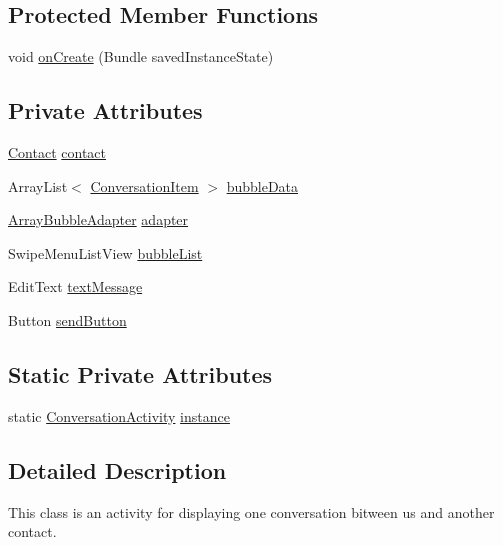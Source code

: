 \subsection*{Protected Member Functions}
\begin{DoxyCompactItemize}
\item 
void \hyperlink{a00006_a85e87cb5ced88dff7c8173ecc4f636d1}{on\+Create} (Bundle saved\+Instance\+State)
\end{DoxyCompactItemize}
\subsection*{Private Attributes}
\begin{DoxyCompactItemize}
\item 
\hyperlink{a00005}{Contact} \hyperlink{a00006_a3459849ab29ad684658dbcd0cf8c5d5a}{contact}
\item 
Array\+List$<$ \hyperlink{a00007}{Conversation\+Item} $>$ \hyperlink{a00006_a68544a0bda28776dfb51718a3c71bf69}{bubble\+Data}
\item 
\hyperlink{a00002}{Array\+Bubble\+Adapter} \hyperlink{a00006_adaad4a865e59995c45ef2ad13f6e88a9}{adapter}
\item 
Swipe\+Menu\+List\+View \hyperlink{a00006_ae5bb074a89738fa417e643960b0041c6}{bubble\+List}
\item 
Edit\+Text \hyperlink{a00006_abc418be8d11246756bfcb7f95123a88d}{text\+Message}
\item 
Button \hyperlink{a00006_a2e4d147a434708e05027f41ecf9ed577}{send\+Button}
\end{DoxyCompactItemize}
\subsection*{Static Private Attributes}
\begin{DoxyCompactItemize}
\item 
static \hyperlink{a00006}{Conversation\+Activity} \hyperlink{a00006_a64a39fb2b7f756356462736dfbdb9f9f}{instance}
\end{DoxyCompactItemize}


\subsection{Detailed Description}
This class is an activity for displaying one conversation bitween us and another contact. 

